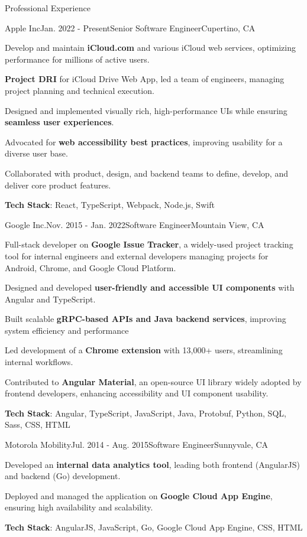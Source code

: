 \documentclass{resume} %
\begin{document}
\begin{rSection}{Professional Experience}

\begin{rSubsection}{Apple Inc}{Jan. 2022 - Present}{Senior Software Engineer}{Cupertino, CA}
\item Develop and maintain \textbf{iCloud.com} and various iCloud web services, optimizing performance for millions of active users.
\item \textbf{Project DRI} for iCloud Drive Web App, led a team of engineers, managing project planning and technical execution.
\item Designed and implemented visually rich, high-performance UIs while ensuring \textbf{seamless user experiences}.
\item Advocated for \textbf{web accessibility best practices}, improving usability for a diverse user base.
\item Collaborated with product, design, and backend teams to define, develop, and deliver core product features.
\item \textbf{Tech Stack}: React, TypeScript, Webpack, Node.js, Swift
\end{rSubsection}


\begin{rSubsection}{Google Inc.}{Nov. 2015 - Jan. 2022}{Software Engineer}{Mountain View, CA}
\item Full-stack developer on \textbf{Google Issue Tracker}, a widely-used project tracking tool for internal engineers and external developers managing projects for Android, Chrome, and Google Cloud Platform.
\item Designed and developed \textbf{user-friendly and accessible UI components} with Angular and TypeScript.
\item Built scalable \textbf{gRPC-based APIs and Java backend services}, improving system efficiency and performance
\item Led development of a \textbf{Chrome extension} with 13,000+ users, streamlining internal workflows.
\item Contributed to \textbf{Angular Material}, an open-source UI library widely adopted by frontend developers, enhancing accessibility and UI component usability.
\item \textbf{Tech Stack}: Angular, TypeScript, JavaScript, Java, Protobuf, Python, SQL, Sass, CSS, HTML

\end{rSubsection}

\begin{rSubsection}{Motorola Mobility}{Jul. 2014 - Aug. 2015}{Software Engineer}{Sunnyvale, CA}
\item Developed an \textbf{internal data analytics tool}, leading both frontend (AngularJS) and backend (Go) development.
\item Deployed and managed the application on \textbf{Google Cloud App Engine}, ensuring high availability and scalability.
\item \textbf{Tech Stack}: AngularJS, JavaScript, Go, Google Cloud App Engine, CSS, HTML
\end{rSubsection}


\end{rSection}
\end{document}
